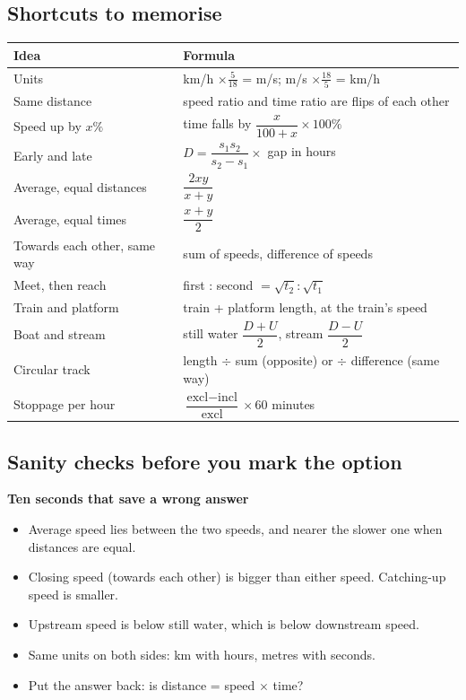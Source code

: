\documentclass[11pt,a4paper]{article}
\let\oldsubsection\subsection
\renewcommand{\subsection}{\needspace{9\baselineskip}\oldsubsection}
\newcommand{\infobox}[2]{\par\medskip\noindent\begingroup\setlength{\fboxsep}{7pt}%
  \colorbox{codebg}{\parbox{\dimexpr\linewidth-14pt\relax}{\textbf{\color{ember}#1}\par\smallskip #2}}\endgroup\par\medskip}
\begin{document}
\subsection*{Shortcuts to memorise}
\begin{center}\small\renewcommand{\arraystretch}{1.75}\setlength{\tabcolsep}{8pt}
\begin{tabularx}{\linewidth}{@{}>{\raggedright\arraybackslash}X>{\raggedright\arraybackslash}X@{}}
\toprule
\textbf{\color{slate}Idea} & \textbf{\color{slate}Formula} \\ \midrule
Units & km/h $\times\tfrac{5}{18}$ = m/s; m/s $\times\tfrac{18}{5}$ = km/h \\
Same distance & speed ratio and time ratio are flips of each other \\
Speed up by $x\%$ & time falls by $\dfrac{x}{100+x}\times 100\%$ \\
Early and late & $D=\dfrac{s_1 s_2}{s_2-s_1}\times$ gap in hours \\
Average, equal distances & $\dfrac{2xy}{x+y}$ \\[6pt]
Average, equal times & $\dfrac{x+y}{2}$ \\[6pt]
Towards each other, same way & sum of speeds, difference of speeds \\
Meet, then reach & first : second $=\sqrt{t_2} : \sqrt{t_1}$ \\
Train and platform & train + platform length, at the train's speed \\
Boat and stream & still water $\dfrac{D+U}{2}$, stream $\dfrac{D-U}{2}$ \\
Circular track & length $\div$ sum (opposite) or $\div$ difference (same way) \\
Stoppage per hour & $\dfrac{\text{excl}-\text{incl}}{\text{excl}}\times 60$ minutes \\
\bottomrule
\end{tabularx}\end{center}

\subsection*{Sanity checks before you mark the option}
\infobox{Ten seconds that save a wrong answer}{
\begin{itemize}
\item Average speed lies between the two speeds, and nearer the slower one when distances are equal.
\item Closing speed (towards each other) is bigger than either speed. Catching-up speed is smaller.
\item Upstream speed is below still water, which is below downstream speed.
\item Same units on both sides: km with hours, metres with seconds.
\item Put the answer back: is distance = speed $\times$ time?
\end{itemize}}
\end{document}
